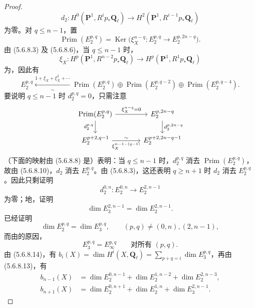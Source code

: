 \begin{proof}
\[d_2:H^0(\mathbf P^1,R^ip_*\mathbf Q_\ell)\longrightarrow H^2(\mathbf P^1,R^{i-1}p_*\mathbf Q_\ell)\]
为零。对 $q\leq n-1$，置
\begin{equation}\tag{5.6.8.9}\operatorname{Prim}(E_2^{p,q})=\operatorname{Ker}\bigl(\xi_X^{n-q}:E_2^{p,q}\to E_2^{p,2n-q}\bigr).\end{equation}
由 (5.6.8.3) 及 (5.6.8.6)，当 $q\leq n-1$ 时，
\[\xi_X:H^p(\mathbf P^1,R^{n-2}p_*\mathbf Q_\ell)\longrightarrow H^p(\mathbf P^1,R^1p_*\mathbf Q_\ell)\]
为，因此有
\begin{equation}\tag{5.6.8.10}E_2^{p,q}\xleftarrow[\sim]{1+\xi_X+\xi_X^2+\cdots}\operatorname{Prim}(E_2^{p,q})\oplus\operatorname{Prim}(E_2^{p,q-2})\oplus\operatorname{Prim}(E_2^{p,q-4}).\end{equation}
要说明 $q\leq n-1$ 时 $d_2^{p,q}=0$，只需注意
\[
\begin{tikzcd}[column sep=large]
\operatorname{Prim}(E_2^{p,q})\arrow[r,"{\xi_X^{n-q}=0}"]\arrow[d,"{d_2^{p,q}}"']&E_2^{p,2n-q}\arrow[d,"{d_2^{p,2n-q}}"]\\
E_2^{p+2,q-1}\arrow[r,"\xi_X^{n-1-(q-1)}"',"\sim"]&E_2^{p+2,2n-q-1}
\end{tikzcd}
\]
（下面的映射由 (5.6.8.8) 是）表明：当 $q\leq n-1$ 时，$d_2^{p,q}$ 消去 $\operatorname{Prim}(E_2^{p,q})$，故由 (5.6.8.10)，$d_2$ 消去 $E_2^{p,q}$。由 (5.6.8.3)，这还表明 $q\geq n+1$ 时 $d_2$ 消去 $E_2^{p,q}$。因此只剩证明
\[d_2^{0,n}:E_2^{0,n}\longrightarrow E_2^{2,n-1}\]
为零；地，证明
\begin{equation}\tag{5.6.8.12}\dim E_3^{2,n-1}=\dim E_2^{2,n-1}.\end{equation}
已经证明
\begin{equation}\tag{5.6.8.13}\dim E_2^{p,q}=\dim E_3^{p,q},\qquad(p,q)\neq(0,n),(2,n-1),\end{equation}
而由的原因，
\begin{equation}\tag{5.6.8.14}E_3^{p,q}=E_\infty^{p,q}\qquad\text{对所有 }(p,q).\end{equation}
由 (5.6.8.14)，有 $b_i(X)=\dim H^i(X,\mathbf Q_\ell)=\sum_{p+q=i}\dim E_3^{p,q}$，再由 (5.6.8.13)，有
\begin{align}
b_{n-1}(X)&=\dim E_2^{0,n-1}+\dim E_2^{1,n-2}+\dim E_2^{2,n-3},\tag{5.6.8.15}\\
b_{n+1}(X)&=\dim E_2^{0,n+1}+\dim E_2^{1,n}+\dim E_3^{2,n-1}.\tag{5.6.8.16}
\end{align}

\end{proof}
